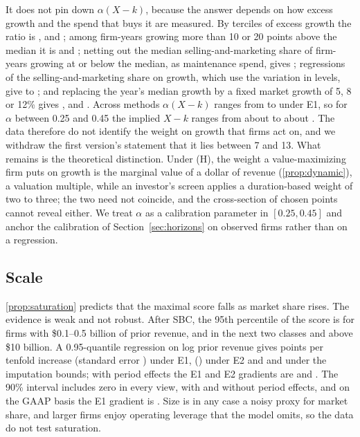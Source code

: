 It does not pin down $\alpha(X-k)$, because the answer depends on how excess growth and the spend that buys it are measured. By terciles of excess growth the ratio is \AlphaTercLow, \AlphaTercMid{} and \AlphaTercHigh; among firm-years growing more than 10 or 20 points above the median it is \AlphaFloorTen{} and \AlphaFloorTwenty; netting out the median selling-and-marketing share of firm-years growing at or below the median, as maintenance spend, gives \AlphaNet; regressions of the selling-and-marketing share on growth, which use the variation in levels, give \AlphaLevelLo{} to \AlphaLevelHi; and replacing the year's median growth by a fixed market growth of 5, 8 or 12\% gives \AlphaGFive, \AlphaGEight{} and \AlphaGTwelve. Across methods $\alpha(X-k)$ ranges from \AlphaAllLo{} to \AlphaAllHi{} under E1, so for $\alpha$ between 0.25 and 0.45 the implied $X-k$ ranges from about \XkLo{} to about \XkHi. The data therefore do not identify the weight on growth that firms act on, and we withdraw the first version's statement that it lies between 7 and 13. What remains is the theoretical distinction. Under (H), the weight a value-maximizing firm puts on growth is the marginal value of a dollar of revenue (\autoref{prop:dynamic}), a valuation multiple, while an investor's screen applies a duration-based weight of two to three; the two need not coincide, and the cross-section of chosen points cannot reveal either. We treat $\alpha$ as a calibration parameter in $[0.25,0.45]$ and anchor the calibration of Section~\ref{sec:horizons} on observed firms rather than on a regression.

\subsection{Scale}
\autoref{prop:saturation} predicts that the maximal score falls as market share rises. The evidence is weak and not robust. After SBC, the 95th percentile of the score is \ScaleClassA{} for firms with \$0.1--0.5 billion of prior revenue, \ScaleClassB{} and \ScaleClassC{} in the next two classes and \ScaleClassD{} above \$10 billion. A 0.95-quantile regression on log prior revenue gives \ScaleCashEone{} points per tenfold increase (standard error \ScaleCashEoneSe) under E1, \ScaleCashEtwo{} (\ScaleCashEtwoSe) under E2 and \ScaleCashImpFour{} and \ScaleCashImpEight{} under the imputation bounds; with period effects the E1 and E2 gradients are \ScaleCashFeEone{} and \ScaleCashFeEtwo. The 90\% interval includes zero in every view, with and without period effects, and on the GAAP basis the E1 gradient is \ScaleOpEone. Size is in any case a noisy proxy for market share, and larger firms enjoy operating leverage that the model omits, so the data do not test saturation.

